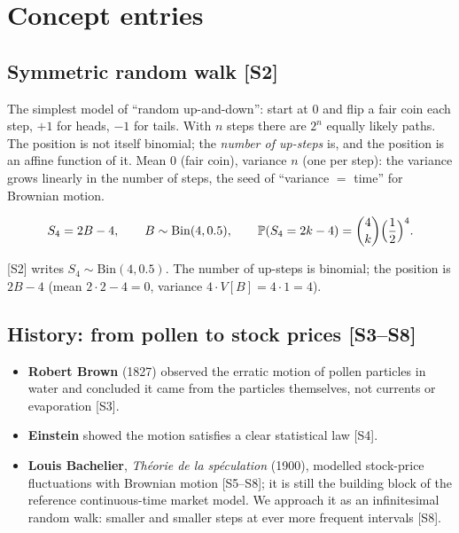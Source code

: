 \documentclass[10pt]{article}
\begin{document}
\section{Concept entries}

\subsection{Symmetric random walk [S2]}
\begin{idea}
The simplest model of ``random up-and-down'': start at 0 and flip a fair coin each step, $+1$ for heads, $-1$ for tails. With $n$ steps there are $2^n$ equally likely paths. The position is not itself binomial; the \emph{number of up-steps} is, and the position is an affine function of it. Mean $0$ (fair coin), variance $n$ (one per step): the variance grows linearly in the number of steps, the seed of ``variance $=$ time'' for Brownian motion.
\end{idea}
\[S_4=2B-4,\qquad B\sim\mathrm{Bin}(4,0.5),\qquad \mathbb{P}(S_4=2k-4)=\binom4k\Big(\frac12\Big)^4.\]
\begin{where}
\end{where}
\begin{exam}
\flag{} [S2] writes $S_4\sim\mathrm{Bin}(4,0.5)$. The number of up-steps is binomial; the position is $2B-4$ (mean $2\cdot2-4=0$, variance $4\cdot V[B]=4\cdot1=4$).
\end{exam}

\subsection{History: from pollen to stock prices [S3--S8]}
\begin{itemize}
\item \textbf{Robert Brown} (1827) observed the erratic motion of pollen particles in water and concluded it came from the particles themselves, not currents or evaporation [S3].
\item \textbf{Einstein} showed the motion satisfies a clear statistical law [S4].
\item \textbf{Louis Bachelier}, \emph{Th\'eorie de la sp\'eculation} (1900), modelled stock-price fluctuations with Brownian motion [S5--S8]; it is still the building block of the reference continuous-time market model. We approach it as an infinitesimal random walk: smaller and smaller steps at ever more frequent intervals [S8].
\end{itemize}
\end{document}
